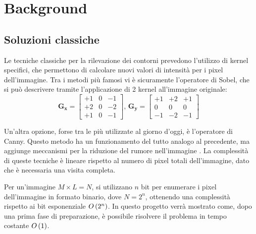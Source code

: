 \section{Background}\label{sec:background}

\subsection{Soluzioni classiche}
Le tecniche classiche per la rilevazione dei contorni prevedono l'utilizzo di 
kernel specifici, che permettono di calcolare nuovi valori di intensità per i pixel 
dell'immagine. Tra i metodi più famosi vi è sicuramente l'operatore di Sobel, 
che si può descrivere tramite l'applicazione di 2 kernel all'immagine originale:
\[
\mathbf{G_x} =
\begin{bmatrix}
+1 & 0 & -1 \\
+2 & 0 & -2 \\
+1 & 0 & -1
\end{bmatrix}
, \, 
\mathbf{G_y} =
\begin{bmatrix}
+1 & +2 & +1 \\
0 & 0 & 0 \\
-1 & -2 & -1
\end{bmatrix}
\]

Un'altra opzione, forse tra le più utilizzate al giorno d'oggi, è l'operatore di Canny.
Questo metodo ha un funzionamento del tutto analogo al precedente, ma aggiunge 
meccanismi per la riduzione del rumore nell'immagine \cite{digital_image_processing}.
La complessità di queste tecniche è lineare rispetto al numero di pixel totali 
dell'immagine, dato che è necessaria una visita completa. 

Per un'immagine $M \times L = N$, si utilizzano $n$ bit per enumerare i pixel dell'immagine
in formato binario, dove $N = 2^n$, ottenendo una complessità rispetto ai bit esponenziale $O\left({2^n}\right)$.
In questo progetto verrà mostrato come, dopo una prima fase di preparazione, è possibile risolvere
il problema in tempo costante $O\left({1}\right)$.